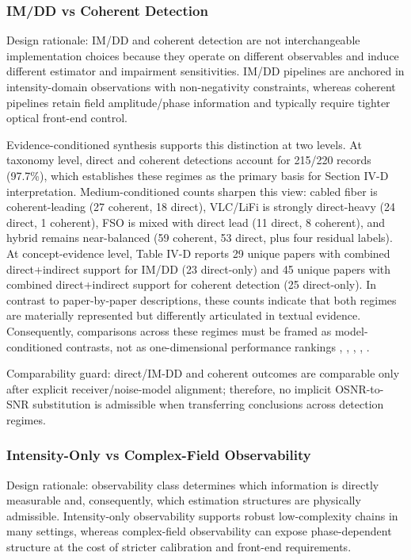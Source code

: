 \subsubsection{IM/DD vs Coherent Detection}
Design rationale: IM/DD and coherent detection are not interchangeable implementation choices because they operate on different observables and induce different estimator and impairment sensitivities. IM/DD pipelines are anchored in intensity-domain observations with non-negativity constraints, whereas coherent pipelines retain field amplitude/phase information and typically require tighter optical front-end control.

Evidence-conditioned synthesis supports this distinction at two levels. At taxonomy level, direct and coherent detections account for 215/220 records (97.7\%), which establishes these regimes as the primary basis for Section IV-D interpretation. Medium-conditioned counts sharpen this view: cabled fiber is coherent-leading (27 coherent, 18 direct), VLC/LiFi is strongly direct-heavy (24 direct, 1 coherent), FSO is mixed with direct lead (11 direct, 8 coherent), and hybrid remains near-balanced (59 coherent, 53 direct, plus four residual labels). At concept-evidence level, Table IV-D reports 29 unique papers with combined direct+indirect support for IM/DD (23 direct-only) and 45 unique papers with combined direct+indirect support for coherent detection (25 direct-only). In contrast to paper-by-paper descriptions, these counts indicate that both regimes are materially represented but differently articulated in textual evidence. Consequently, comparisons across these regimes must be framed as model-conditioned contrasts, not as one-dimensional performance rankings \cite{O_ISAC_001}, \cite{O_ISAC_023}, \cite{O_ISAC_028}, \cite{O_ISAC_029}, \cite{O_ISAC_190}.

Comparability guard: direct/IM-DD and coherent outcomes are comparable only after explicit receiver/noise-model alignment; therefore, no implicit OSNR-to-SNR substitution is admissible when transferring conclusions across detection regimes.

\subsubsection{Intensity-Only vs Complex-Field Observability}
Design rationale: observability class determines which information is directly measurable and, consequently, which estimation structures are physically admissible. Intensity-only observability supports robust low-complexity chains in many settings, whereas complex-field observability can expose phase-dependent structure at the cost of stricter calibration and front-end requirements.

